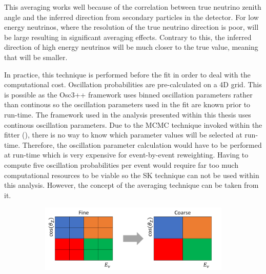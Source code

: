 This averaging works well because of the correlation between true neutrino zenith angle and the inferred direction from secondary particles in the detector. For low energy neutrinos, where the resolution of the true neutrino direction is poor,  will be large resulting in significant averaging effects. Contrary to this, the inferred direction of high energy neutrinos will be much closer to the true value, meaning that  will be smaller.

In practice, this technique is performed before the fit in order to deal with the computational cost. Oscillation probabilities are pre-calculated on a 4D grid. This is possible as the Osc3++ framework uses binned oscillation parameters rather than continous so the oscillation parameters used in the fit are known prior to run-time. The framework used in the analysis presented within this thesis uses continous oscillation parameters. Due to the MCMC technique invoked within the fitter (), there is no way to know which parameter values will be selected at run-time. Therefore, the oscillation parameter calculation would have to be performed at run-time which is very expensive for event-by-event reweighting. Having to compute five oscillation probabilities per event would require far too much computational resources to be viable so the SK technique can not be used within this analysis. However, the concept of the averaging technique can be taken from it.

\begin{figure}[h]
  \begin{subfigure}[t]{\textwidth}
    \includegraphics[width=\textwidth, trim={0mm 0mm 0mm 0mm}, clip,page=1]{Figures/Oscillation/SubSamplingExample.pdf}
  \end{subfigure}
  \caption{}
  \label{fig:Oscillation_SK_SubSamplingExample}
\end{figure}
